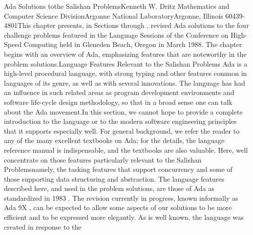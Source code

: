 
\Doc[]
\DivBod[]
\DivLii[]Ada
Solutions to\newlinetag[]
the Salishan Problems\HdMjEndii[]
Kenneth W. Dritz%
\HdMiscEndvi[]
\HdMiscLvi[\HdMiscLviStyAPosPostvskp=0pt \HdMiscLviStyAPosPrevskp=0pt ]Mathematics
and Computer Science Division\HdMiscEndvi[]
\HdMiscLvi[\HdMiscLviStyAPosPostvskp=0pt \HdMiscLviStyAPosPrevskp=0pt ]Argonne
National Laboratory\HdMiscEndvi[]
\HdMiscLvi[\HdMiscLviStyAPosPostvskp=20pt plus7pt minus4pt \HdMiscLviStyAPosPrevskp=0pt ]Argonne,
Illinois 60439-4801\HdMiscEndvi[]
\Para[]This chapter presents, in Sections 
through , revised Ada solutions to the
four challenge problems featured in the Language Sessions of the Conference
on High-Speed Computing held in Gleneden Beach, Oregon in March 1988.
The chapter begins with an overview of Ada, emphasizing features that
are noteworthy in the problem solutions.\Endpara[]
\DivLiii[]\HdMjLiii[]Language Features Relevant to the Salishan Problems%
\HdMjEndiii[]
\Para[]Ada is a high-level procedural language, with strong typing
and other features common in languages of its genre, as well as with
several innovations. The language has had an influence in such related
areas as program development environments and software life-cycle
design methodology, so that in a broad sense one can talk about \ldquo[]the
Ada movement.\rdquo[] In this section, we cannot hope to provide a
complete introduction to the language or to the modern software engineering
principles that it supports especially well. For general background,
we refer the reader to any of the many excellent textbooks on Ada;
for the details, the language reference manual is indispensable, and
the textbooks are also valuable. Here, we\rsquo[]ll concentrate on
those features particularly relevant to the Salishan Problems\EmDash[]namely,
the tasking features that support concurrency and some of those supporting
data structuring and abstraction. The language features described
here, and used in the problem solutions, are those of Ada as standardized
in 1983 \Endcit[]. The revision currently
in progress, known informally as Ada 9X %
\Endcit[], can be expected to allow some aspects of our solutions
to be more efficient and to be expressed more elegantly.%
\Endpara[]
\Para[]As is well known, the language was created in response to the
